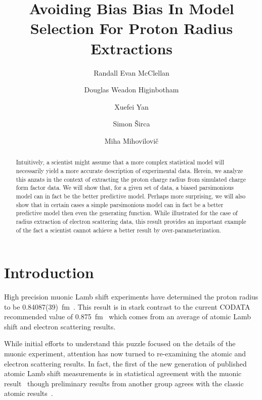 \documentclass[10pt,aps,prc,twocolumn]{revtex4-1}
\begin{document}
\title{Avoiding Bias Bias In Model Selection For Proton Radius Extractions}

\author{Randall Evan McClellan}
\author{Douglas Weadon Higinbotham}
\author{Xuefei Yan}
\author{Simon \v{S}irca}
\author{Miha Mihovilovi\v{c}}

\begin{abstract}
Intuitively, a scientist might assume that a more complex statistical model will necessarily yield a more 
accurate description of experimental data.   Herein, we analyze this anzats in the context of extracting 
the proton charge radius from simulated charge form factor data.  We will show that, for a given set of data, 
a biased parsimonious model can in fact be the better predictive model.  Perhaps more surprising,
we will also show that in certain cases a simple parsimonious model can in fact be a better predictive model 
then even the generating function.   While illustrated for the case of radius extraction of electron scattering data,
this result provides an important example of the fact a scientist cannot achieve a better result by
over-parameterization.
\end{abstract}

\maketitle

\section{Introduction}

High precision muonic Lamb shift experiments have determined the proton radius to 
be 0.84087(39)~fm~\cite{Pohl:2010zza,Antognini:1900ns}.   This result is in stark contrast to the current
CODATA recommended value of 0.875~fm~\cite{Mohr:2015ccw} which comes from an average of atomic 
Lamb shift and electron scattering results.  

While initial efforts to understand this puzzle focused on the details of the muonic experiment, attention has
now turned to re-examining the atomic and electron scattering results.   In fact, the first of the
new generation of published atomic Lamb shift measurements is in statistical agreement with the muonic 
result~\cite{Beyer79} though preliminary results from another group agrees with the classic atomic 
results~\cite{fleurbaey:tel-01633631}.
\end{document}
